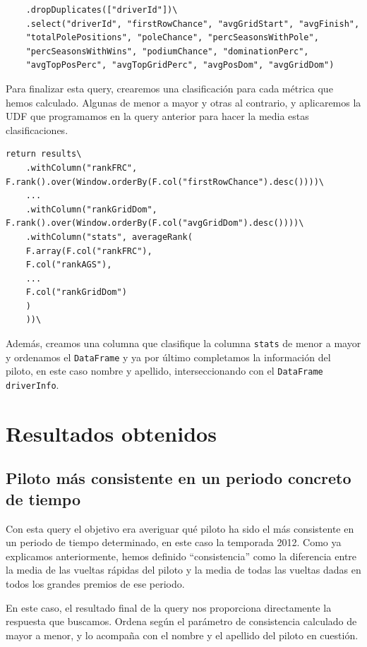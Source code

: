 \documentclass[12pt,twoside,titlepage]{report}
\newcommand{\quotes}[1]{``#1''}
\begin{document}
\begin{lstlisting}
	.dropDuplicates(["driverId"])\
	.select("driverId", "firstRowChance", "avgGridStart", "avgFinish", 
	"totalPolePositions", "poleChance", "percSeasonsWithPole", 
	"percSeasonsWithWins", "podiumChance", "dominationPerc", 
	"avgTopPosPerc", "avgTopGridPerc", "avgPosDom", "avgGridDom")
\end{lstlisting}

Para finalizar esta query, crearemos una clasificación para cada métrica que hemos calculado. Algunas de menor a mayor y otras al contrario, y aplicaremos la UDF que programamos en la query anterior para hacer la media estas clasificaciones.

\begin{lstlisting}
return results\
	.withColumn("rankFRC", F.rank().over(Window.orderBy(F.col("firstRowChance").desc())))\
	...
	.withColumn("rankGridDom", F.rank().over(Window.orderBy(F.col("avgGridDom").desc())))\
	.withColumn("stats", averageRank(
	F.array(F.col("rankFRC"),
	F.col("rankAGS"),
	...
	F.col("rankGridDom")
	)
	))\
\end{lstlisting}

Además, creamos una columna que clasifique la columna \texttt{stats} de menor a mayor y ordenamos el \texttt{DataFrame} y ya por último completamos la información del piloto, en este caso nombre y apellido, interseccionando con el \texttt{DataFrame} \texttt{driverInfo}.


\chapter{Resultados obtenidos}
\label{sec:apendice2}

\section{Piloto más consistente en un periodo concreto de tiempo}

Con esta query el objetivo era averiguar qué piloto ha sido el más consistente en un periodo de tiempo determinado, en este caso la temporada 2012. Como ya explicamos anteriormente, hemos definido \quotes{consistencia} como la diferencia entre la media de las vueltas rápidas del piloto y la media de todas las vueltas dadas en todos los grandes premios de ese periodo.

En este caso, el resultado final de la query nos proporciona directamente la respuesta que buscamos. Ordena según el parámetro de consistencia calculado de mayor a menor, y lo acompaña con el nombre y el apellido del piloto en cuestión.
\end{document}
